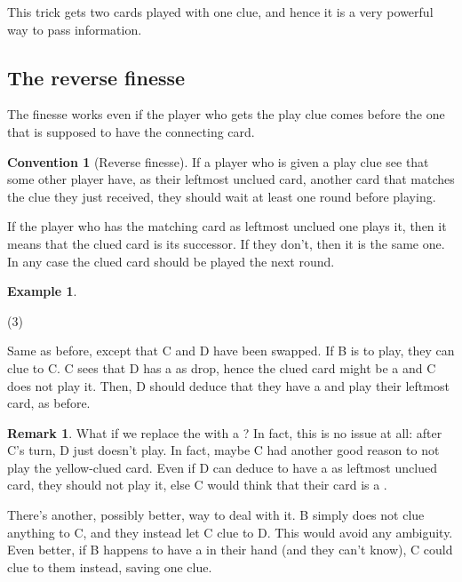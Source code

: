 \documentclass[a4paper]{article}
\theoremstyle{plain}
\theoremstyle{definition}
\newtheorem{remark}[theorem]{Remark}
\newtheorem{example}[theorem]{Example}
\newtheorem{convention}[theorem]{Convention}
\begin{document}
This trick gets two cards played with one clue, and hence it is a very powerful way to pass information.

\subsection{The reverse finesse}

The finesse works even if the player who gets the play clue comes before the one that is supposed to have the connecting card. 

\begin{convention}[Reverse finesse]
	If a player who is given a play clue see that some other player have, as their leftmost unclued card, another card that matches the clue they just received, they should wait at least one round before playing.
\end{convention}

If the player who has the matching card as leftmost unclued one plays it, then it means that the clued card is its successor. If they don't, then it is the same one. In any case the clued card should be played the next round.

\begin{example}
	\hfill
	\begin{tasks}(3)
		\task[+]      
		\task[A]    
		\task[B]    
		\task[C]    
		\task[D]    
		\task[E]    
	\end{tasks}
	
	Same as before, except that C and D have been swapped. If B is to play, they can clue  to C. C sees that D has a  as drop, hence the clued card might be a  and C does not play it. Then, D should deduce that they have a  and play their leftmost card, as before.
\end{example}

\begin{remark}
	What if we replace the  with a ? In fact, this is no issue at all: after C's turn, D just doesn't play. In fact, maybe C had another good reason to not play the yellow-clued card. Even if D can deduce to have a  as leftmost unclued card, they should not play it, else C would think that their card is a .
	
	There's another, possibly better, way to deal with it. B simply does not clue anything to C, and they instead let C clue  to D. This would avoid any ambiguity. Even better, if B happens to have a  in their hand (and they can't know), C could clue  to them instead, saving one clue.
\end{remark}
\end{document}
